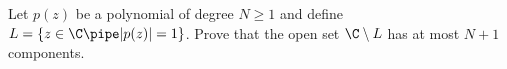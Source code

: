 Let $p(z)$ be a polynomial of degree $N\geq 1$ and define $L=\{z\in
\C \pipe |p(z)|=1\}$. Prove that the open set $\C\setminus L$ has at most
$N+1$ components. 
